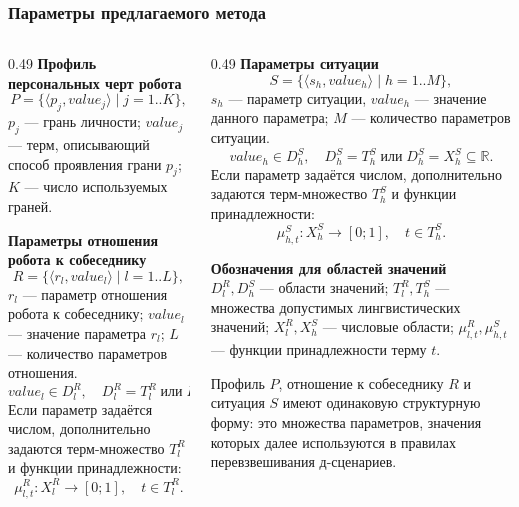 \documentclass{beamer}
\begin{document}
\begin{frame}
    \frametitle{Параметры предлагаемого метода}
    \tiny
    \begin{columns}[T,onlytextwidth]
        \begin{column}{0.49\textwidth}
            \scriptsize\textbf{Профиль персональных черт робота}\tiny
            \[
                P = \{\langle p_j, value_j \rangle \mid j = 1..K\},
            \]
            \(p_j\) --- грань личности; \(value_j\) --- терм, описывающий
            способ проявления грани \(p_j\); \(K\) --- число используемых граней.

            \vspace{0.3cm}
            \scriptsize\textbf{Параметры отношения робота к собеседнику}\tiny
            \[
                R = \{\langle r_l, value_l \rangle \mid l = 1..L\},
            \]
            \(r_l\) --- параметр отношения робота к собеседнику;
            \(value_l\) --- значение параметра \(r_l\);
            \(L\) --- количество параметров отношения.
            \[
                value_l \in D^R_l,\quad
                D^R_l = T^R_l \;\textrm{или}\; D^R_l = X^R_l \subseteq \mathbb{R}.
            \]
            Если параметр задаётся числом, дополнительно задаются терм-множество
            \(T^R_l\) и функции принадлежности:
            \[
                \mu^R_{l,t}: X^R_l \rightarrow [0; 1], \quad t \in T^R_l.
            \]
        \end{column}

        \begin{column}{0.49\textwidth}
            \scriptsize\textbf{Параметры ситуации}\tiny
            \[
                S = \{\langle s_h, value_h \rangle \mid h = 1..M\},
            \]
            \(s_h\) --- параметр ситуации, \(value_h\) --- значение данного
            параметра; \(M\) --- количество параметров ситуации.
            \[
                value_h \in D^S_h,\quad
                D^S_h = T^S_h \;\textrm{или}\; D^S_h = X^S_h \subseteq \mathbb{R}.
            \]
            Если параметр задаётся числом, дополнительно задаются терм-множество
            \(T^S_h\) и функции принадлежности:
            \[
                \mu^S_{h,t}: X^S_h \rightarrow [0; 1], \quad t \in T^S_h.
            \]

            \vspace{0.15cm}
            \textbf{Обозначения для областей значений}\\
            \(D^R_l, D^S_h\) --- области значений; \(T^R_l, T^S_h\) ---
            множества допустимых лингвистических значений; \(X^R_l, X^S_h\)
            --- числовые области; \(\mu^R_{l,t}, \mu^S_{h,t}\) ---
            функции принадлежности терму \(t\).

            \vspace{0.15cm}
            Профиль \(P\), отношение к собеседнику \(R\) и ситуация \(S\) имеют
            одинаковую структурную форму: это множества параметров, значения
            которых далее используются в правилах перевзвешивания д-сценариев.
        \end{column}
    \end{columns}
\end{frame}
\end{document}

